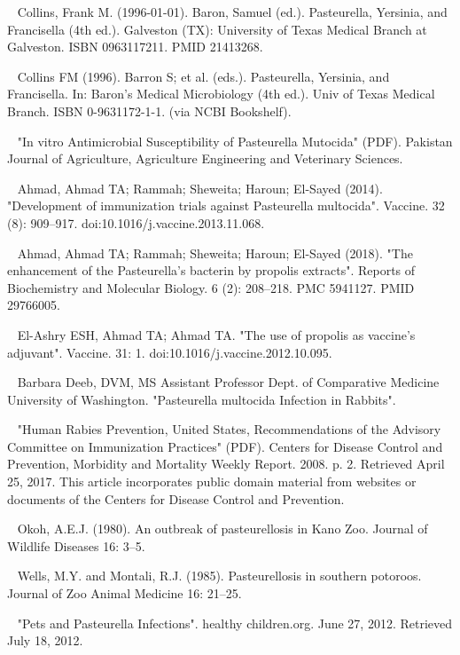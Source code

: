 \documentclass[11pt]{article}
\begin{document}
\begin{thebibliography}{3}
	~ Collins, Frank M. (1996-01-01). Baron, Samuel (ed.). Pasteurella, Yersinia, and Francisella (4th ed.). Galveston (TX): University of Texas Medical Branch at Galveston. ISBN 0963117211. PMID 21413268.
	
	~ Collins FM (1996). Barron S; et al. (eds.). Pasteurella, Yersinia, and Francisella. In: Baron's Medical Microbiology (4th ed.). Univ of Texas Medical Branch. ISBN 0-9631172-1-1. (via NCBI Bookshelf).

	~ "In vitro Antimicrobial Susceptibility of Pasteurella Mutocida" (PDF). Pakistan Journal of Agriculture, Agriculture Engineering and Veterinary Sciences.
	
	~ Ahmad, Ahmad TA; Rammah; Sheweita; Haroun; El-Sayed (2014). "Development of immunization trials against Pasteurella multocida". Vaccine. 32 (8): 909–917. doi:10.1016/j.vaccine.2013.11.068.
	
	~ Ahmad, Ahmad TA; Rammah; Sheweita; Haroun; El-Sayed (2018). "The enhancement of the Pasteurella's bacterin by propolis extracts". Reports of Biochemistry and Molecular Biology. 6 (2): 208–218. PMC 5941127. PMID 29766005.
	
	~ El-Ashry ESH, Ahmad TA; Ahmad TA. "The use of propolis as vaccine's adjuvant". Vaccine. 31: 1. doi:10.1016/j.vaccine.2012.10.095.
	
	~ Barbara Deeb, DVM, MS Assistant Professor Dept. of Comparative Medicine University of Washington. "Pasteurella multocida Infection in Rabbits".

	~ "Human Rabies Prevention, United States, Recommendations of the Advisory Committee on Immunization Practices" (PDF). Centers for Disease Control and Prevention, Morbidity and Mortality Weekly Report. 2008. p. 2. Retrieved April 25, 2017.  This article incorporates public domain material from websites or documents of the Centers for Disease Control and Prevention.

	~ Okoh, A.E.J. (1980). An outbreak of pasteurellosis in Kano Zoo. Journal of Wildlife Diseases 16: 3–5.
	
	~ Wells, M.Y. and Montali, R.J. (1985). Pasteurellosis in southern potoroos. Journal of Zoo Animal Medicine 16: 21–25.
	
	~ "Pets and Pasteurella Infections". healthy children.org. June 27, 2012. Retrieved July 18, 2012.
	

\end{thebibliography}
\end{document}

